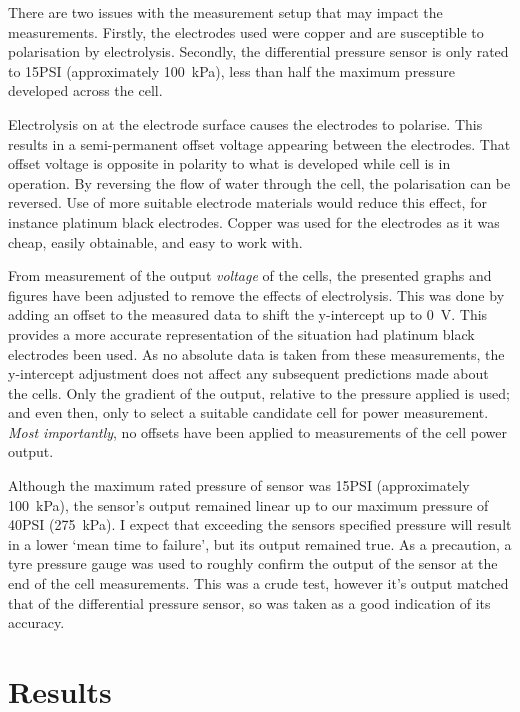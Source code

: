     There are two issues with the measurement setup that may impact the measurements.
    Firstly, the electrodes used were copper and are susceptible to polarisation by electrolysis.
    Secondly, the differential pressure sensor is only rated to 15\thinspace PSI (approximately \SI{100}{\kilo\pascal}), less than half the maximum pressure developed across the cell.

    Electrolysis on at the electrode surface causes the electrodes to polarise.
    This results in a semi-permanent offset voltage appearing between the electrodes.
    That offset voltage is opposite in polarity to what is developed while cell is in operation.
    By reversing the flow of water through the cell, the polarisation can be reversed.
    Use of more suitable electrode materials would reduce this effect, for instance platinum black electrodes.
    Copper was used for the electrodes as it was cheap, easily obtainable, and easy to work with.

    From measurement of the output \emph{voltage} of the cells, the presented graphs and figures have been adjusted to remove the effects of electrolysis.
    This was done by adding an offset to the measured data to shift the y-intercept up to \SI{0}{\volt}.
    This provides a more accurate representation of the situation had platinum black electrodes been used.
    As no absolute data is taken from these measurements, the y-intercept adjustment does not affect any subsequent predictions made about the cells.
    Only the gradient of the output, relative to the pressure applied is used; and even then, only to select a suitable candidate cell for power measurement.
    \emph{Most importantly}, no offsets have been applied to measurements of the cell power output.

    Although the maximum rated pressure of sensor was 15\thinspace PSI (approximately \SI{100}{\kilo\pascal}), the sensor's output remained linear up to our maximum pressure of 40\thinspace PSI (\SI{275}{\kilo\pascal}).
    I expect that exceeding the sensors specified pressure will result in a lower `mean time to failure', but its output remained true.
    As a precaution, a tyre pressure gauge was used to roughly confirm the output of the sensor at the end of the cell measurements.
    This was a crude test, however it's output matched that of the differential pressure sensor, so was taken as a good indication of its accuracy.


\section{Results}
  \label{sect:part1_energyHarvesting_results}


